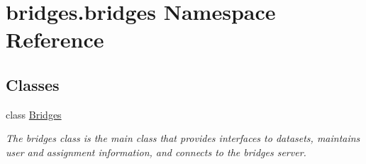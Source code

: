 \hypertarget{namespacebridges_1_1bridges}{}\section{bridges.\+bridges Namespace Reference}
\label{namespacebridges_1_1bridges}
\subsection*{Classes}
\begin{DoxyCompactItemize}
\item 
class \hyperlink{classbridges_1_1bridges_1_1_bridges}{Bridges}
\begin{DoxyCompactList}\small\item\em The bridges class is the main class that provides interfaces to datasets, maintains user and assignment information, and connects to the bridges server. \end{DoxyCompactList}\end{DoxyCompactItemize}
